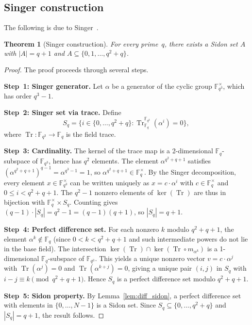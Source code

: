\documentclass[11pt]{amsart}
\theoremstyle{plain}
\newtheorem{theorem}{Theorem}[section]
\theoremstyle{definition}
\theoremstyle{remark}
\begin{document}
\subsection{Singer construction}

The following is due to Singer~\cite{singer_1938}.

\begin{theorem}[Singer construction]\label{thm:singer}
For every prime~$q$, there exists a Sidon set $A$ with $|A| = q + 1$
and $A \subseteq \{0, 1, \dots, q^2 + q\}$.
\end{theorem}

\begin{proof}
The proof proceeds through several steps.

\textbf{Step~1: Singer generator.}
Let $\alpha$ be a generator of the cyclic group
$\mathbb{F}_{q^3}^\times$, which has order $q^3 - 1$.

\textbf{Step~2: Singer set via trace.}
Define
\[
  S_q = \{i \in \{0,\dots,q^2+q\} :
    \operatorname{Tr}_{\mathbb{F}_q}^{\mathbb{F}_{q^3}}(\alpha^i)
    = 0\},
\]
where
$\operatorname{Tr}\colon \mathbb{F}_{q^3} \to \mathbb{F}_q$ is the
field trace.

\textbf{Step~3: Cardinality.}
The kernel of the trace map is a 2-dimensional
$\mathbb{F}_q$-subspace of $\mathbb{F}_{q^3}$, hence has $q^2$
elements.
The element $\alpha^{q^2+q+1}$ satisfies
$(\alpha^{q^2+q+1})^{q-1} = \alpha^{q^3-1} = 1$, so
$\alpha^{q^2+q+1} \in \mathbb{F}_q^\times$.
By the Singer decomposition, every element
$x \in \mathbb{F}_{q^3}^\times$ can be written uniquely as
$x = c \cdot \alpha^i$ with $c \in \mathbb{F}_q^\times$ and
$0 \le i < q^2+q+1$.
The $q^2 - 1$ nonzero elements of $\ker(\operatorname{Tr})$ are
thus in bijection with $\mathbb{F}_q^\times \times S_q$.
Counting gives $(q-1) \cdot |S_q| = q^2 - 1 = (q-1)(q+1)$,
so $|S_q| = q + 1$.

\textbf{Step~4: Perfect difference set.}
For each nonzero $k$ modulo $q^2+q+1$, the element
$\alpha^k \notin \mathbb{F}_q$ (since $0 < k < q^2+q+1$ and such
intermediate powers do not lie in the base field).
The intersection
$\ker(\operatorname{Tr}) \cap
  \ker(\operatorname{Tr} \circ m_{\alpha^k})$
is a 1-dimensional $\mathbb{F}_q$-subspace of $\mathbb{F}_{q^3}$.
This yields a unique nonzero vector $v = c \cdot \alpha^j$ with
$\operatorname{Tr}(\alpha^j) = 0$ and
$\operatorname{Tr}(\alpha^{k+j}) = 0$, giving a unique pair
$(i,j)$ in $S_q$ with $i - j \equiv k \pmod{q^2+q+1}$.
Hence $S_q$ is a perfect difference set modulo $q^2+q+1$.

\textbf{Step~5: Sidon property.}
By Lemma~\ref{lem:diff_sidon}, a perfect difference set with elements
in $\{0,\dots,N-1\}$ is a Sidon set.
Since $S_q \subseteq \{0,\dots,q^2+q\}$ and $|S_q| = q+1$, the
result follows.
\end{proof}
\end{document}
